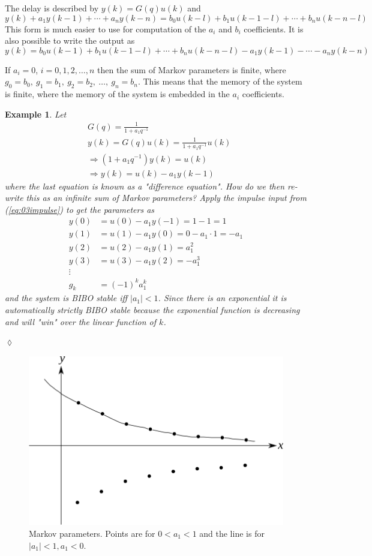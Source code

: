 \documentclass[lecture,12pt,]{pcms-l}
\theoremstyle{example}
\newtheorem{example}{Example}[section]
\begin{document}
The delay is described by $y(k) = G(q)u(k)$ and
$$y(k) + a_1y(k-1)+\cdots + a_ny(k-n) = b_0u(k-l)+b_1u(k-1-l) + \cdots + b_nu(k-n-l)$$
This form is much easier to use for computation of the $a_i$ and $b_i$ coefficients. It is also possible to write the output as
$$y(k) = b_0u(k-1) + b_1u(k-1-l) + \cdots + b_nu(k-n-l) - a_1y(k-1) - \cdots - a_ny(k-n)$$

If $a_i=0$, $i=0,1,2,\ldots,n$ then the sum of Markov parameters is finite, where $g_0=b_0, ~g_1=b_1, ~g_2=b_2, ~\ldots, ~g_n=b_n$. This means that the memory of the system is finite, where the memory of the system is embedded in the $a_i$ coefficients.

\begin{example}
Let
\begin{align*}
&G(q) = \frac{1}{1+a_1q^{-1}} \\
&y(k) = G(q)u(k) = \frac{1}{1+a_1q^{-1}}u(k) \\
&\Rightarrow (1+a_1q^{-1})y(k) = u(k) \\
&\Rightarrow y(k) = u(k) - a_1y(k-1)
\end{align*}
where the last equation is known as a "difference equation". How do we then re-write this as an infinite sum of Markov parameters? Apply the impulse input from (\ref{eq:03impulse}) to get the parameters as
\begin{align*}
y(0) &= u(0) - a_1y(-1) = 1-1 = 1 \\
y(1) &= u(1) - a_1y(0) = 0 - a_1 \cdot 1 = -a_1 \\
y(2) &= u(2) - a_1y(1) = a_1^2 \\
y(3) &= u(3) - a_1y(2) = -a_1^3 \\
\vdots & \\
g_k &= (-1)^ka_1^k
\end{align*}
and the system is BIBO stable iff $|a_1|<1$. Since there is an exponential it is automatically strictly BIBO stable because the exponential function is decreasing and will "win" over the linear function of $k$.
\end{example}
$\lozenge$
\begin{figure}[ht!]
	\centering
	\includegraphics[width=.5\textwidth]{images/03markovParams}
	\caption{Markov parameters. Points are for $0<a_1<1$ and the line is for $|a_1|<1, a_1<0$.}
	\label{fig:03markovParams}
\end{figure}
\end{document}
